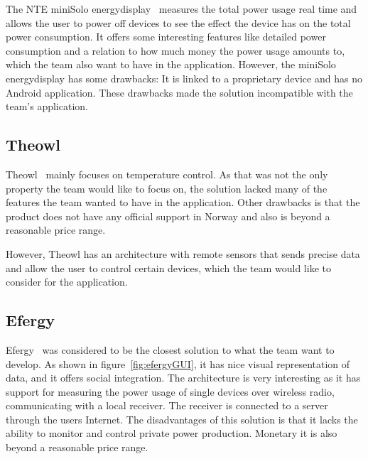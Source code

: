 The NTE miniSolo energydisplay~\cite{nte} measures the total power usage real time and allows the user to power off devices to see the effect the device has on the total power consumption. It offers some interesting features like detailed power consumption and a relation to how much money the power usage amounts to, which the team also want to have in the application. However, the miniSolo energydisplay has some drawbacks: It is linked to a proprietary device and has no Android application. These drawbacks made the solution incompatible with the team's application.



\subsection{Theowl}

Theowl~\cite{theowl} mainly focuses on temperature control. 
As that was not the only property the team would like to focus on, the solution lacked many of the features the team wanted to have in the application. Other drawbacks is that the product does not have any official support in Norway and also is beyond a reasonable price range. 

However, Theowl has an architecture with remote sensors that sends precise data and allow the user to control certain devices, which the team would like to consider for the application.


\subsection{Efergy}

Efergy~\cite{efergy} was considered to be the closest solution to what the team want to develop. As shown in figure~\ref{fig:efergyGUI}, it has nice visual representation of data, and it offers social integration. The architecture is very interesting as it has support for measuring the power usage of single devices over wireless radio, communicating with a local receiver. The receiver is connected to a server through the users Internet. The disadvantages of this solution is that it lacks the ability to monitor and control private power production. Monetary it is also beyond a reasonable price range.

